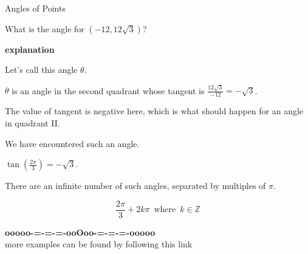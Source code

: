 \documentclass{ximera}
\begin{document}
\begin{example} Angles of Points


What is the angle for $(-12, 12 \sqrt{3})$?


\textbf{\textcolor{red!75!green}{explanation}} 



Let's call this angle $\theta$.


$\theta$ is an angle in the second quadrant whose tangent is $\frac{12 \sqrt{3}}{-12} = -\sqrt{3}$.


The value of tangent is negative here, which is what should happen for an angle in quadrant II.



We have encountered such an angle. 



$\tan\left( \frac{2 \pi}{3} \right) = -\sqrt{3}$.


There are an infinite number of such angles, separated by multiples of $\pi$.


\[
\frac{2 \pi}{3} + 2 k \pi \, \text{ where } \, k \in \mathbb{Z}
\]




\end{example}
















































\begin{onlineOnly}
\begin{center}
\textbf{\textcolor{green!50!black}{ooooo-=-=-=-ooOoo-=-=-=-ooooo}} \\

more examples can be found by following this link\\ 

\end{center}
\end{onlineOnly}
\end{document}
